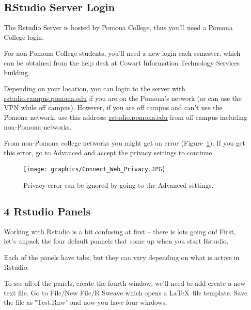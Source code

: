 \documentclass[12pt]{../SOP4_alpha}
\begin{document}
\subsection{RStudio Server Login}

\NP The Rstudio Server is hosted by Pomona College, thus you'll need a Pomona College login. 

\NP For non-Pomona College students, you'll need a new login each semester, which can be obtained from the help desk at Cowart Information Technology Services building.

\NP Depending on your location, you can login to the server with \url{rstudio.campus.pomona.edu} if you are on the Pomona's network (or can use the VPN while off campus). However, if you are off campus and can't use the Pomona network, use this address: \url{rstudio.pomona.edu} from off campus including non-Pomona networks.

\NP From non-Pomona college networks you might get an error (Figure~\ref{fig:privacyerror}). If you get this error, go to Advanced and accept the privacy settings to continue.

\begin{figure}[t]
\centering
\texttt{[image: graphics/Connect\_Web\_Privacy.JPG]}
\caption{Privacy error can be ignored by going to the Advanced settings.}
\label{fig:privacyerror}
\end{figure}


\subsection{4 Rstudio Panels}

Working with Rstudio is a bit confusing at first -- there is lots going on! First, let's unpack the four default pannels that come up when you start Rstudio. 

\NP Each of the panels have tabs, but they can vary depending on what is active in Rstudio. 

\NP To see all of the panels, create the fourth window, we'll need to add create a new text file. Go to File/New File/R Sweave which opens a \LaTeX\ file template. Save the file as "Test.Rnw" and now you have four windows.
\end{document}
